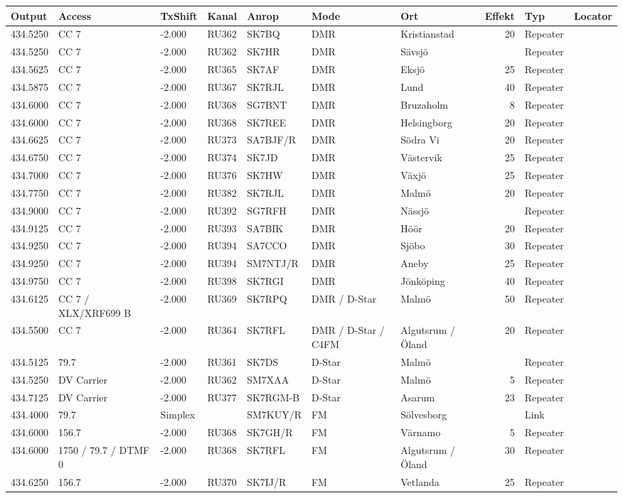 \begin{longtable}{lllllllrlr}
Output & Access & TxShift & Kanal & Anrop & Mode & Ort & Effekt & Typ & Locator \\ \hline
434.5250&CC 7&-2.000&RU362&SK7BQ&DMR&Kristianstad&20&Repeater&\\
434.5250&CC 7&-2.000&RU362&SK7HR&DMR&Sävsjö&&Repeater&\\
434.5625&CC 7&-2.000&RU365&SK7AF&DMR&Eksjö&25&Repeater&\\
434.5875&CC 7&-2.000&RU367&SK7RJL&DMR&Lund&40&Repeater&\\
434.6000&CC 7&-2.000&RU368&SG7BNT&DMR&Bruzaholm&8&Repeater&\\
434.6000&CC 7&-2.000&RU368&SK7REE&DMR&Helsingborg&20&Repeater&\\
434.6625&CC 7&-2.000&RU373&SA7BJF/R&DMR&Södra Vi&20&Repeater&\\
434.6750&CC 7&-2.000&RU374&SK7JD&DMR&Västervik&25&Repeater&\\
434.7000&CC 7&-2.000&RU376&SK7HW&DMR&Växjö&25&Repeater&\\
434.7750&CC 7&-2.000&RU382&SK7RJL&DMR&Malmö&20&Repeater&\\
434.9000&CC 7&-2.000&RU392&SG7RFH&DMR&Nässjö&&Repeater&\\
434.9125&CC 7&-2.000&RU393&SA7BIK&DMR&Höör&20&Repeater&\\
434.9250&CC 7&-2.000&RU394&SA7CCO&DMR&Sjöbo&30&Repeater&\\
434.9250&CC 7&-2.000&RU394&SM7NTJ/R&DMR&Aneby&25&Repeater&\\
434.9750&CC 7&-2.000&RU398&SK7RGI&DMR&Jönköping&40&Repeater&\\
434.6125&CC 7 / XLX/XRF699 B&-2.000&RU369&SK7RPQ&DMR / D-Star&Malmö&50&Repeater&\\
434.5500&CC 7&-2.000&RU364&SK7RFL&DMR / D-Star / C4FM&Algutsrum / Öland&20&Repeater&\\
434.5125&79.7&-2.000&RU361&SK7DS&D-Star&Malmö&&Repeater&\\
434.5250&DV Carrier&-2.000&RU362&SM7XAA&D-Star&Malmö&5&Repeater&\\
434.7125&DV Carrier&-2.000&RU377&SK7RGM-B&D-Star&Asarum&23&Repeater&\\
434.4000&79.7&Simplex&&SM7KUY/R&FM&Sölvesborg&&Link&\\
434.6000&156.7&-2.000&RU368&SK7GH/R&FM&Värnamo&5&Repeater&\\
434.6000&1750 / 79.7 / DTMF 0&-2.000&RU368&SK7RFL&FM&Algutsrum / Öland&30&Repeater&\\
434.6250&156.7&-2.000&RU370&SK7IJ/R&FM&Vetlanda&25&Repeater&\\

\end{longtable}
